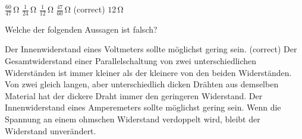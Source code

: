 \documentclass[11pt]{exam}
\begin{document}
\begin{questions}
\begin{choices}
	\choice \(\mathrm{\frac{60}{47}\,\Omega}\)
	\choice \(\mathrm{\frac{1}{24}\,\Omega}\)
	\choice \(\mathrm{\frac{1}{12}\,\Omega}\)
	\choice \(\mathrm{\frac{47}{60}\,\Omega}\) (correct)
	\choice \(\mathrm{12\,\Omega}\)
\end{choices}

\vspace{3mm}\question Welche der folgenden Aussagen ist falsch?

\begin{choices}
	\choice Der Innenwiderstand eines Voltmeters sollte möglichst gering sein. (correct)
	\choice Der Gesamtwiderstand einer Parallelschaltung von zwei unterschiedlichen Widerständen ist immer kleiner als der kleinere von den beiden Widerständen.
	\choice Von zwei gleich langen, aber unterschiedlich dicken Drähten aus demselben Material hat der dickere Draht immer den geringeren Widerstand.
	\choice Der Innenwiderstand eines Amperemeters sollte möglichst gering sein.
	\choice Wenn die Spannung an einem ohmschen Widerstand verdoppelt wird, bleibt der Widerstand unverändert.
\end{choices}

\vspace{3mm}\end{questions}
\end{document}

